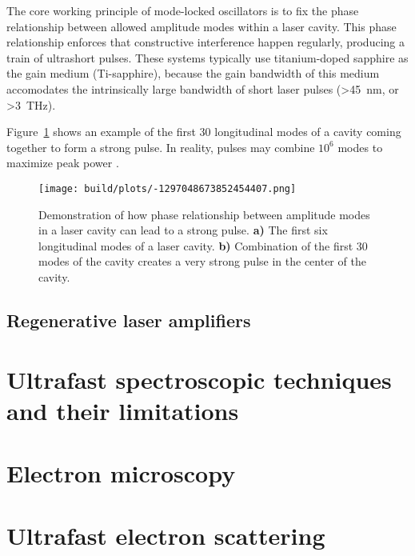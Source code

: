 \documentclass[
  11pt,
  canadian,
  a4paper,
  open=right,
  twoside=true,
  cleardoublepage=empty,
  clearpage=empty]{scrbook}
\begin{document}
The core working principle of mode-locked oscillators is to fix the phase relationship between allowed amplitude modes within a laser cavity. This phase relationship enforces that constructive interference happen regularly, producing a train of ultrashort pulses. These systems typically use titanium-doped sapphire as the gain medium (Ti-sapphire), because the gain bandwidth of this medium accomodates the intrinsically large bandwidth of short laser pulses (\SI{>45}{\nano\meter}, or \SI{>3}{\tera\hertz}).

Figure~\ref{fig:mode-locking} shows an example of the first 30 longitudinal modes of a cavity coming together to form a strong pulse. In reality, pulses may combine \(10^6\) modes to maximize peak power \citep{Siegman1986}.

\begin{figure}
\hypertarget{fig:mode-locking}{%
\centering
\texttt{[image: build/plots/-1297048673852454407.png]}
\caption{Demonstration of how phase relationship between amplitude modes in a laser cavity can lead to a strong pulse. \textbf{a)} The first six longitudinal modes of a laser cavity. \textbf{b)} Combination of the first 30 modes of the cavity creates a very strong pulse in the center of the cavity.}\label{fig:mode-locking}
}
\end{figure}

\hypertarget{regenerative-laser-amplifiers}{%
\subsection{Regenerative laser amplifiers}\label{regenerative-laser-amplifiers}}

\hypertarget{sec:spectroscopy}{%
\section{Ultrafast spectroscopic techniques and their limitations}\label{sec:spectroscopy}}

\hypertarget{sec:microscopy}{%
\section{Electron microscopy}\label{sec:microscopy}}

\hypertarget{sec:scattering}{%
\section{Ultrafast electron scattering}\label{sec:scattering}}
\end{document}
